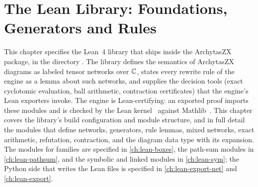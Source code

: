 \chapter{The Lean Library: Foundations, Generators and Rules}\label{ch:lean-core}

\providecommand{\leanLLone}{\lstinline[style=leancore,frame=none,basicstyle=\ttfamily,%
  breaklines=true,breakatwhitespace=false]}

This chapter specifies the Lean~4 library that ships inside the ArchytasZX package, in the
directory . The library defines the semantics of ArchytasZX diagrams as
labeled tensor networks over $\mathbb{C}$, states every rewrite rule of the engine as a lemma about such
networks, and supplies the decision tools (exact cyclotomic evaluation, ball arithmetic,
contraction certificates) that the engine's Lean exporters invoke. The engine is
Lean-certifying: an exported proof imports these modules and is checked by the Lean
kernel~\cite{demoura2021lean4} against Mathlib~\cite{mathlib2020}. This chapter covers the
library's build configuration and module structure, and in full detail the modules that define
networks, generators, rule lemmas, mixed networks, exact arithmetic, refutation, contraction, and
the diagram data type with its \bbox{} expansion. The modules for \bbox{} families are specified in
\cref{ch:lean-boxes}, the path-sum modules in \cref{ch:lean-pathsum}, and the symbolic and linked
modules in \cref{ch:lean-sym}; the Python side that writes the Lean files is specified in
\cref{ch:lean-export-net} and \cref{ch:lean-export}.

